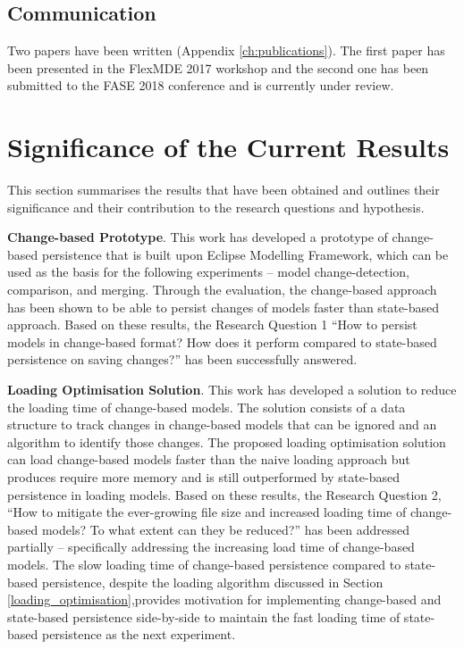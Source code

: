 \documentclass[12pt, a4paper]{report} \usepackage[titletoc]{appendix}
\begin{document}
\subsection{Communication}
\label{subsec:communication}
Two papers have been written (Appendix \ref{ch:publications}). The first paper \cite{yohannis2017turning} has been presented in the FlexMDE 2017 workshop and the second one \cite{yohannis2018algorithm} has been submitted to the FASE 2018 conference and is currently under review.


\section{Significance of the Current Results}
\label{sec:significance_and_contribution_of_current_results}
This section summarises the results that have been obtained and outlines their significance and their contribution to the research questions and hypothesis.

\textbf{Change-based Prototype}. This work has developed a prototype of change-based persistence that is built upon Eclipse Modelling Framework, which can be used as the basis for the following experiments -- model change-detection, comparison, and merging. Through the evaluation, the change-based approach has been shown to be able to persist changes of models faster than state-based approach. Based on these results, the Research Question 1 ``How to persist models in change-based format? How does it perform compared to state-based persistence on saving changes?'' has been successfully answered.

\textbf{Loading Optimisation Solution}. This work has developed a solution to reduce the loading time of change-based models. The solution consists of a data structure to track changes in change-based models that can be ignored and an algorithm to identify those changes. The proposed loading optimisation solution can load change-based models faster than the naive loading approach but produces require more memory and is still outperformed by state-based persistence in loading models. Based on these results, the Research Question 2, ``How to mitigate the ever-growing file size and increased loading time of change-based models? To what extent can they be reduced?'' has been addressed partially -- specifically addressing the increasing load time of change-based models. The slow loading time of change-based persistence compared to state-based persistence, despite the loading algorithm discussed in Section \ref{loading_optimisation},provides motivation for implementing change-based and state-based persistence side-by-side to maintain the fast loading time of state-based persistence as the next experiment.
\end{document}
